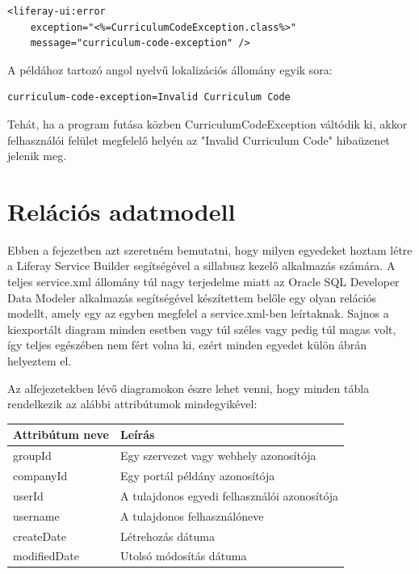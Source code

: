 \documentclass[hidelinks, 12pt, a4paper]{report}
\begin{document}
\begin{minipage}{\linewidth}
\begin{center}
\begin{lstlisting}[basicstyle=\small]
<liferay-ui:error
	exception="<%=CurriculumCodeException.class%>"
	message="curriculum-code-exception" />
\end{lstlisting}
\end{center}
\end{minipage}

\noindent A példához tartozó angol nyelvű lokalizációs állomány egyik sora:

\begin{minipage}{\linewidth}
\begin{center}
\begin{lstlisting}[basicstyle=\small]
curriculum-code-exception=Invalid Curriculum Code
\end{lstlisting}
\end{center}
\end{minipage}

\noindent Tehát, ha a program futása közben CurriculumCodeException váltódik ki, akkor felhasználói felület megfelelő helyén az "Invalid Curriculum Code" hibaüzenet jelenik meg.

\section{Relációs adatmodell}

Ebben a fejezetben azt szeretném bemutatni, hogy milyen egyedeket hoztam létre a Liferay Service Builder segítségével a sillabusz kezelő alkalmazás számára. A teljes service.xml állomány túl nagy terjedelme miatt az Oracle SQL Developer Data Modeler alkalmazás segítségével készítettem belőle egy olyan relációs modellt, amely egy az egyben megfelel a service.xml-ben leírtaknak. Sajnos a kiexportált diagram minden esetben vagy túl széles vagy pedig túl magas volt, így teljes egészében nem fért volna ki, ezért minden egyedet külön ábrán helyeztem el.

Az alfejezetekben lévő diagramokon észre lehet venni, hogy minden tábla rendelkezik az alábbi attribútumok mindegyikével:

\begin{table}[H]
	\centering
	\begin{tabular}{| l | l |}
	\hline
	\textbf{Attribútum neve} & \textbf{Leírás} \\
	\hline
	groupId & Egy szervezet vagy webhely azonosítója \\
	\hline
	companyId & Egy portál példány azonosítója \\
	\hline
	userId & A tulajdonos egyedi felhasználói azonosítója \\
	\hline
	username & A tulajdonos felhasználóneve \\
	\hline
	createDate & Létrehozás dátuma \\
	\hline
	modifiedDate & Utolsó módosítás dátuma \\
	\hline
\end{tabular}
\end{table}
\end{document}
